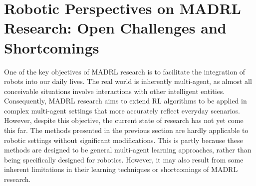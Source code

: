 







\section{Robotic Perspectives on MADRL Research: Open Challenges and Shortcomings}\label{sec:MADRL_RobotPerspective}

One of the key objectives of MADRL research is to facilitate the integration of robots into our daily lives. The real world is inherently multi-agent, as almost all conceivable situations involve interactions with other intelligent entities. Consequently, MADRL research aims to extend RL algorithms to be applied in complex multi-agent settings that more accurately reflect everyday scenarios. However, despite this objective, the current state of research has not yet come this far. The methods presented in the previous section are hardly applicable to robotic settings without significant modifications. This is partly because these methods are designed to be general multi-agent learning approaches, rather than being specifically designed for robotics. However, it may also result from some inherent limitations in their learning techniques or shortcomings of MADRL research. 


